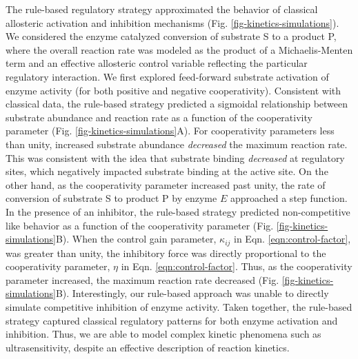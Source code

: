\documentclass[processes,article,accept,moreauthors,pdftex,12pt,a4paper]{mdpi}
\begin{document}
The rule-based regulatory strategy approximated the behavior of classical allosteric activation and inhibition mechanisms (Fig. \ref{fig-kinetics-simulations}). 
We considered the enzyme catalyzed conversion of substrate S to a product P, where the overall reaction rate was modeled as the product of a Michaelis-Menten term and an effective allosteric control variable reflecting the particular regulatory interaction. 
We first explored feed-forward substrate activation of enzyme activity (for both positive and negative cooperativity). 
Consistent with classical data, the rule-based strategy predicted a sigmoidal relationship between substrate abundance and reaction rate as a function of the cooperativity parameter (Fig. \ref{fig-kinetics-simulations}A). 
For cooperativity parameters less than unity, increased substrate abundance \textit{decreased} the maximum reaction rate. 
This was consistent with the idea that substrate binding \textit{decreased} at regulatory sites, which negatively impacted substrate binding at the active site. 
On the other hand, as the cooperativity parameter increased past unity, the rate of conversion of substrate S to product P by enzyme $E$ approached a step function. 
In the presence of an inhibitor, the rule-based strategy predicted non-competitive like behavior as a function of the cooperativity parameter (Fig. \ref{fig-kinetics-simulations}B). 
When the control gain parameter, $\kappa_{ij}$ in Eqn. \eqref{eqn:control-factor}, was greater than unity, the inhibitory force was directly proportional to the cooperativity parameter, $\eta$ in Eqn. \eqref{eqn:control-factor}. 
Thus, as the cooperativity parameter increased, the maximum reaction rate decreased (Fig. \ref{fig-kinetics-simulations}B). 
Interestingly, our rule-based approach was unable to directly simulate competitive inhibition of enzyme activity. 
Taken together, the rule-based strategy captured classical regulatory patterns for both enzyme activation and inhibition. 
Thus, we are able to model complex kinetic phenomena such as ultrasensitivity, despite an effective description of reaction kinetics. 
\end{document}
